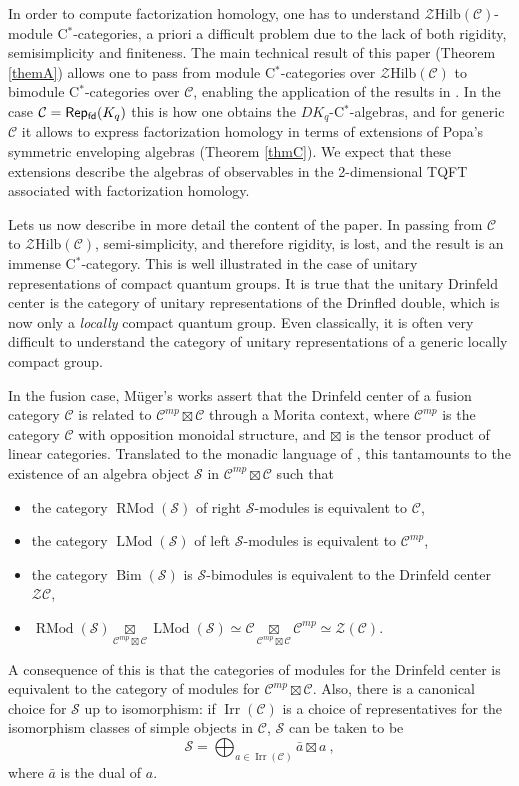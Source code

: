 \documentclass[a4paper,11pt,reqno]{amsart}
\numberwithin{equation}{section}
\theoremstyle{remark}
\theoremstyle{definition}
\newcommand{\cC}{\mathcal C}
\newcommand{\cS}{\mathcal S}
\newcommand{\cZ}{\mathcal Z}
\newcommand{\fdRep}{{\sf Rep_{fd}}}
\DeclareMathOperator{\Irr}{Irr}
\DeclareMathOperator{\Bim}{Bim}
\DeclareMathOperator{\RMod}{RMod}
\DeclareMathOperator{\LMod}{LMod}
\newcommand{\Hilb}{\mathrm{Hilb}}
\begin{document}
In order to compute factorization homology, one has to understand $\cZ \Hilb(\cC)$-module C$^*$-categories, a priori a difficult problem due to the lack of both rigidity, semisimplicity and finiteness. The main technical result of this paper (Theorem \ref{themA}) allows one to pass from module C$^*$-categories over $\cZ\Hilb(\cC)$ to bimodule C$^*$-categories over $\cC$, enabling the application of the results in \cite{hataishi2025categorical}. In the case $\cC = \fdRep(K_q)$ this is how one obtains the $DK_q$-C$^*$-algebras, and for generic $\cC$ it allows to express factorization homology in terms of extensions of Popa's symmetric enveloping algebras (Theorem \ref{thmC}). We expect that these extensions describe the algebras of observables in the 2-dimensional TQFT associated with factorization homology.




\medskip
Lets us now describe in more detail the content of the paper. In passing from $\cC$ to $\cZ\Hilb(\cC)$, semi-simplicity, and therefore rigidity, is lost, and the result is an immense C$^*$-category. This is well illustrated in the case of unitary representations of compact quantum groups. It is true that the unitary Drinfeld center is the category of unitary representations of the Drinfled double, which is now only a {\em locally} compact quantum group. Even classically, it is often very difficult to understand the category of unitary representations of a generic locally compact group.

 In the fusion case, Müger's works \cites{MR1966524,MR1966525} assert that the Drinfeld center of a fusion category 
$\cC$ is related to $\cC^{mp} \boxtimes \cC$ through a Morita context, where $\cC^{mp}$ is the category $\cC$ with opposition monoidal structure, and $\boxtimes$ is the tensor product of linear categories. Translated to the monadic language of \cites{MR2355605,MR2793022,MR2869176,MR3079759}, this tantamounts to the existence of an algebra object $\cS$ in $\cC^{mp} \boxtimes \cC$ such that
\begin{itemize}
	\item the category $\RMod(\cS)$ of right $\cS$-modules is equivalent to $\cC$,
	\item the category $\LMod(\cS)$ of left $\cS$-modules is equivalent to $\cC^{mp}$,
	\item the category $\Bim(\cS)$ is $\cS$-bimodules is equivalent to the Drinfeld center $\cZ\cC$,
	\item $\RMod(\cS) \underset{\cC^{mp} \boxtimes \cC}{\boxtimes} \LMod(\cS) \simeq \cC  \underset{\cC^{mp} \boxtimes \cC}{\boxtimes} \cC^{mp} \simeq \cZ(\cC)$.
\end{itemize}
A consequence of this is that the categories of modules for the Drinfeld center is equivalent to the category of modules for $\cC^{mp} \boxtimes \cC$. Also, there is a canonical choice for $\cS$ up to isomorphism: if $\Irr(\cC)$ is a choice of representatives for the isomorphism classes of simple objects in $\cC$, $\cS$ can be taken to be
\[
\cS = \bigoplus_{a \in \Irr(\cC)} \bar{a} \boxtimes a \ ,
\]
where $\bar{a}$ is the dual of $a$.
\end{document}

